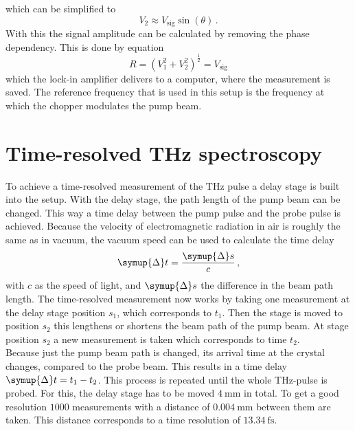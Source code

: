 which can be simplified to 
\begin{equation}
    V_2 \approx V_\text{sig} \sin(\theta)\,.
\end{equation}
With this the signal amplitude can be calculated by removing the phase dependency.
This is done by equation
\begin{equation}
    R = \left ( V_1^2+V_2^2 \right )^{\frac{1}{2}} = V_\text{sig}
\end{equation}
which the lock-in amplifier delivers to a computer, where the measurement is saved.
The reference frequency that is used in this setup is the frequency at which the chopper modulates the pump beam.
\section{Time-resolved THz spectroscopy}
\label{sec:time_domain}
To achieve a time-resolved measurement of the $\si{\tera\hertz}$ pulse a delay stage is built into the setup.
With the delay stage, the path length of the pump beam can be changed.
This way a time delay between the pump pulse and the probe pulse is achieved.
Because the velocity of electromagnetic radiation in air is roughly the same as in vacuum, the vacuum speed can be used to calculate the time delay   
\begin{equation}
    \symup{\Delta} t = \frac{\symup{\Delta} s}{c}\, ,
\end{equation}
with $c$ as the speed of light, and $\symup{\Delta} s$ the difference in the beam path length.
The time-resolved measurement now works by taking one measurement at the delay stage position $s_1$, which corresponds to $t_1$.
Then the stage is moved to position $s_2$ this lengthens or shortens the beam path of the pump beam.
At stage position $s_2$ a new measurement is taken which corresponds to time $t_2$.
\\
Because just the pump beam path is changed, its arrival time at the crystal changes, compared to the probe beam.
This results in a time delay $\symup{\Delta} t = t_1-t_2$.
This process is repeated until the whole $\si{\tera\hertz}$-pulse is probed.
For this, the delay stage has to be moved $\SI{4}{\milli\meter}$ in total.
To get a good resolution $1000$ measurements with a distance of $\SI{0.004}{\milli\meter}$ between them are taken.
This distance corresponds to a time resolution of $\SI{13.34}{\femto\second}$.

